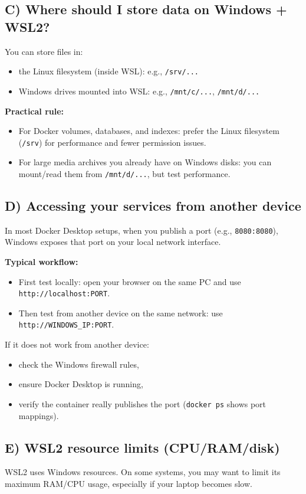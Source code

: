 \subsection{C) Where should I store data on Windows + WSL2?}
You can store files in:
\begin{itemize}[leftmargin=*]
  \item the Linux filesystem (inside WSL): e.g., \texttt{/srv/...}
  \item Windows drives mounted into WSL: e.g., \texttt{/mnt/c/...}, \texttt{/mnt/d/...}
\end{itemize}

\textbf{Practical rule:}
\begin{itemize}[leftmargin=*]
  \item For Docker volumes, databases, and indexes: prefer the Linux filesystem (\texttt{/srv}) for performance and fewer permission issues.
  \item For large media archives you already have on Windows disks: you can mount/read them from \texttt{/mnt/d/...}, but test performance.
\end{itemize}

\subsection{D) Accessing your services from another device}
In most Docker Desktop setups, when you publish a port (e.g., \texttt{8080:8080}),
Windows exposes that port on your local network interface.

\textbf{Typical workflow:}
\begin{itemize}[leftmargin=*]
  \item First test locally: open your browser on the same PC and use \texttt{http://localhost:PORT}.
  \item Then test from another device on the same network: use \texttt{http://WINDOWS\_IP:PORT}.
\end{itemize}

If it does not work from another device:
\begin{itemize}[leftmargin=*]
  \item check the Windows firewall rules,
  \item ensure Docker Desktop is running,
  \item verify the container really publishes the port (\texttt{docker ps} shows port mappings).
\end{itemize}

\subsection{E) WSL2 resource limits (CPU/RAM/disk)}
WSL2 uses Windows resources. On some systems, you may want to limit its maximum RAM/CPU usage,
especially if your laptop becomes slow.

